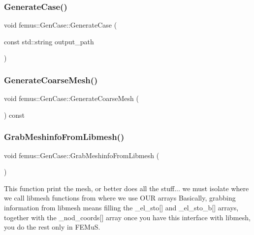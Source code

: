 \subsubsection{\texorpdfstring{Generate\+Case()}{GenerateCase()}}
{\footnotesize\ttfamily void femus\+::\+Gen\+Case\+::\+Generate\+Case (\begin{DoxyParamCaption}\item[{const std\+::string}]{output\+\_\+path }\end{DoxyParamCaption})}

\mbox{\label{classfemus_1_1_gen_case_a8a58afe0ec434646bc59dafb2925b0ff}} 
\subsubsection{\texorpdfstring{Generate\+Coarse\+Mesh()}{GenerateCoarseMesh()}}
{\footnotesize\ttfamily void femus\+::\+Gen\+Case\+::\+Generate\+Coarse\+Mesh (\begin{DoxyParamCaption}{ }\end{DoxyParamCaption}) const}

\mbox{\label{classfemus_1_1_gen_case_a16d995f5a08faf6e7cd89e9f750734e9}} 
\subsubsection{\texorpdfstring{Grab\+Meshinfo\+From\+Libmesh()}{GrabMeshinfoFromLibmesh()}}
{\footnotesize\ttfamily void femus\+::\+Gen\+Case\+::\+Grab\+Meshinfo\+From\+Libmesh (\begin{DoxyParamCaption}{ }\end{DoxyParamCaption})}

This function print the mesh, or better does all the stuff... we must isolate where we call libmesh functions from where we use O\+UR arrays Basically, grabbing information from libmesh means filling the \+\_\+el\+\_\+sto\mbox{[}\mbox{]} and \+\_\+el\+\_\+sto\+\_\+b\mbox{[}\mbox{]} arrays, together with the \+\_\+nod\+\_\+coords\mbox{[}\mbox{]} array once you have this interface with libmesh, you do the rest only in F\+E\+MuS. \mbox{\label{classfemus_1_1_gen_case_a2b47da5519d3b8d3d3d4778bc07deef3}} 
